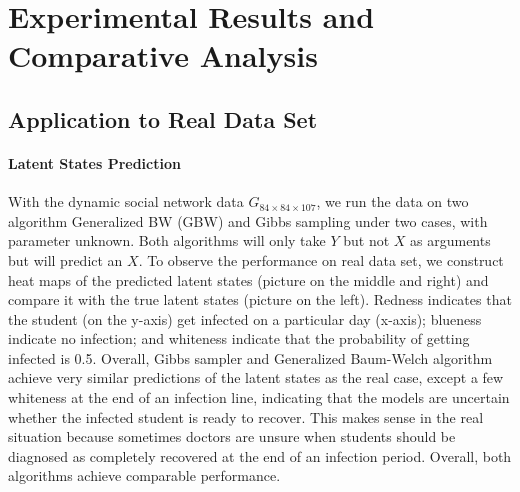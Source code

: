 \documentclass{article} %
\begin{document}
\section{Experimental Results and Comparative Analysis}

\subsection{Application to Real Data Set}

\paragraph {Latent States Prediction} With the dynamic social network data $G_{84\times84\times107}$,  we run the data on two algorithm Generalized BW (GBW) and Gibbs sampling under two cases, with parameter unknown. Both algorithms will only take $Y$ but not $X$ as arguments but will predict an $X$. To observe the performance on real data set, we construct heat maps of the predicted latent states (picture on the middle and right) and compare it with the true latent states (picture on the left). Redness indicates that the student (on the y-axis) get infected on a particular day (x-axis); blueness indicate no infection; and whiteness indicate that the probability of getting infected is 0.5. Overall, Gibbs sampler and Generalized Baum-Welch algorithm achieve very similar predictions of the latent states as the real case, except a few whiteness at the end of an infection line, indicating that the models are uncertain whether the infected student is ready to recover. This makes sense in the real situation because sometimes doctors are unsure when students should be diagnosed as completely recovered at the end of an infection period. Overall, both algorithms achieve comparable performance.
\end{document}
